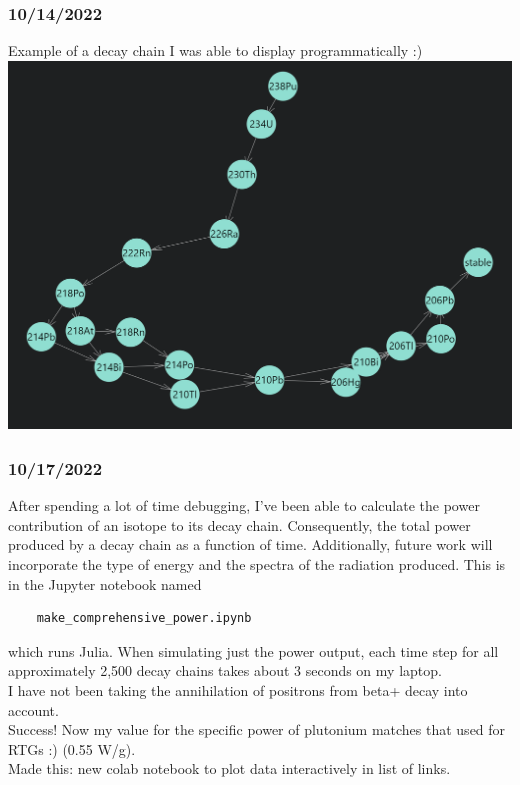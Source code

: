 \documentclass[12pt]{article}
\begin{document}
\subsubsection{10/14/2022}
Example of a decay chain I was able to display programmatically :)\\
\includegraphics[]{Images/better_snip.PNG}
\subsubsection{10/17/2022}
After spending a lot of time debugging, I've been able to calculate the power contribution of an isotope to its decay chain. Consequently, the total power produced by a decay chain as a function of time. Additionally, future work will incorporate the type of energy and the spectra of the radiation produced. This is in the Jupyter notebook named 
\begin{verbatim}
    make_comprehensive_power.ipynb
\end{verbatim}
which runs Julia. When simulating just the power output, each time step for all approximately 2,500 decay chains takes about 3 seconds on my laptop. \\
I have not been taking the annihilation of positrons from beta+ decay into account. \\
Success! Now my value for the specific power of plutonium matches that used for RTGs :) (0.55 W/g). \\
Made this: new colab notebook to plot data interactively in list of links. 
\end{document}
